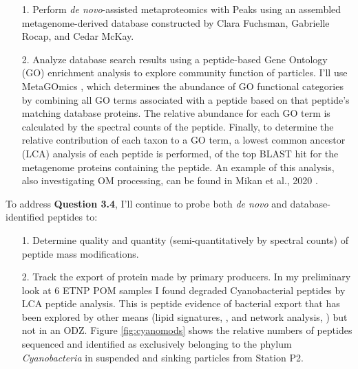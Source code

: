 \documentclass[12pt, letterpaper, twoside]{article}
\begin{document}
\begin{enumerate}
	\item[1.] Perform \textit{de novo}-assisted metaproteomics with Peaks using an assembled metagenome-derived database constructed by Clara Fuchsman, Gabrielle Rocap, and Cedar McKay.
	\item[2.] Analyze database search results using a peptide-based Gene Ontology (GO) enrichment analysis to explore community function of particles. I'll use MetaGOmics \cite{riffle_metagomics_2017}, which determines the abundance of GO functional categories by combining all GO terms associated with a peptide based on that peptide's matching database proteins. The relative abundance for each GO term is calculated by the spectral counts of the peptide. Finally, to determine the relative contribution of each taxon to a GO term, a lowest common ancestor (LCA) analysis of each peptide is performed, of the top BLAST hit for the metagenome proteins containing the peptide. An example of this analysis, also investigating OM processing, can be found in Mikan et al., 2020 \cite{mikan_metaproteomics_2020}.
\end{enumerate}  

To address \textbf{Question 3.4}, I'll continue to probe both \textit{de novo} and database-identified peptides to:

\begin{enumerate}
	\item[1.] Determine quality and quantity (semi-quantitatively by spectral counts) of peptide mass modifications.
	\item[2.] Track the export of protein made by primary producers. In my preliminary look at 6 ETNP POM samples I found degraded Cyanobacterial peptides by LCA peptide analysis. This is peptide evidence of bacterial export that has been explored by other means (lipid signatures, \cite{close_export_2013}, and network analysis, \cite{richardson_small_2007}) but not in an ODZ. Figure \ref{fig:cyanomods} shows the relative numbers of peptides sequenced and identified as exclusively belonging to the phylum \textit{Cyanobacteria} in suspended and sinking particles from Station P2.
\end{enumerate}
\end{document}
